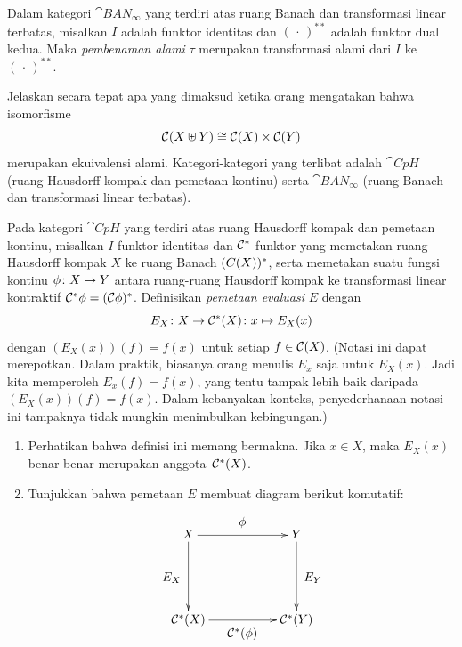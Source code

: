 \begin{exam}\label{exam_2dual_nat} Dalam kategori $\cat{BAN_{\boldsymbol\infty}}$ yang terdiri atas ruang Banach
dan transformasi linear terbatas, misalkan $I$ adalah funktor identitas dan $(\,\cdot\,)^{**}$ adalah
funktor dual kedua.  Maka
\emph{pembenaman alami} $\tau$ merupakan transformasi alami dari $I$ ke~$(\,\cdot\,)^{**}$.
\end{exam}

\begin{exam} Jelaskan secara tepat apa yang dimaksud ketika orang mengatakan bahwa isomorfisme
    \[ \mathcal{C}(X \uplus Y) \cong \mathcal{C}(X) \times \mathcal{C}(Y) \]
merupakan ekuivalensi alami.  Kategori-kategori yang terlibat adalah $\cat{CpH}$ (ruang Hausdorff kompak
dan pemetaan kontinu) serta $\cat{BAN_\infty}$ (ruang Banach dan transformasi linear
terbatas).
\end{exam}

\begin{exam}\label{C057724} Pada kategori $\cat{CpH}$ yang terdiri atas ruang Hausdorff kompak dan
pemetaan kontinu, misalkan $I$ funktor identitas dan $\mathcal{C}^*$ funktor yang
memetakan ruang Hausdorff kompak $X$ ke ruang Banach $\mathcal{(}C(X))^*$, serta memetakan suatu
fungsi kontinu $\phi\colon X \rightarrow Y$ antara ruang-ruang Hausdorff kompak ke
transformasi linear kontraktif $\mathcal{C}^*\phi = (\mathcal{C}\phi)^*$. Definisikan
\emph{pemetaan evaluasi} $E$ dengan
  \[ E_X\colon X \rightarrow \mathcal{C}^*(X)\colon x \mapsto E_X(x) \]
dengan $(E_X(x))(f) = f(x)$ untuk setiap $f \in \mathcal{C}(X)$.  (Notasi ini dapat merepotkan.  Dalam praktik, biasanya orang menulis
$E_x$ saja untuk $E_X(x)$.  Jadi kita memperoleh $E_x(f) = f(x)$, yang tentu tampak lebih baik daripada $(E_X(x))(f) = f(x)$.  Dalam kebanyakan
konteks, penyederhanaan notasi ini tampaknya tidak mungkin menimbulkan kebingungan.)
 \begin{enumerate}
  \item[(a)]  Perhatikan bahwa definisi ini memang bermakna. Jika $x \in X$, maka $E_X(x)$ benar-benar
merupakan anggota~$\mathcal{C}^*(X)$.
  \item[(b)] Tunjukkan bahwa pemetaan $E$ membuat diagram berikut komutatif:
     \[ \xymatrix@+30pt{{X}\ar[r]^*+{\phi} \ar[d]_*+{E_X}
            & {Y} \ar[d]^*+{E_Y} \\
          {\fml C^*(X)} \ar[r]_*+{\fml C^*(\phi)} & {\fml C^*(Y)}   }
     \]
 \end{enumerate}
\end{exam}

